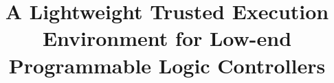 \documentclass[sigconf]{acmart}
\begin{document}
\title{A Lightweight Trusted Execution Environment for Low-end Programmable Logic Controllers}











\end{document}
